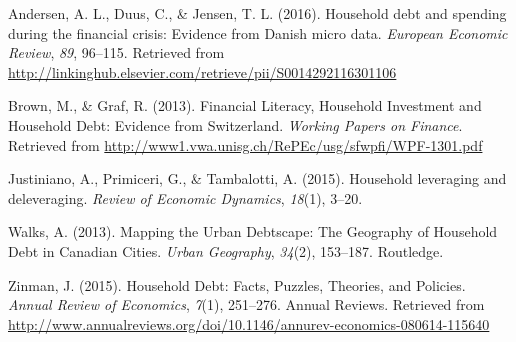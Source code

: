 \documentclass[10pt,twoside]{article}
\begin{document}
\hypertarget{refs}{}
\leavevmode\hypertarget{ref-Andersen2016}{}%
Andersen, A. L., Duus, C., \& Jensen, T. L. (2016). Household debt and
spending during the financial crisis: Evidence from Danish micro data.
\emph{European Economic Review}, \emph{89}, 96--115. Retrieved from
\url{http://linkinghub.elsevier.com/retrieve/pii/S0014292116301106}

\leavevmode\hypertarget{ref-Brown2013}{}%
Brown, M., \& Graf, R. (2013). Financial Literacy, Household Investment
and Household Debt: Evidence from Switzerland. \emph{Working Papers on
Finance}. Retrieved from
\url{http://www1.vwa.unisg.ch/RePEc/usg/sfwpfi/WPF-1301.pdf}

\leavevmode\hypertarget{ref-Justiniano2015b}{}%
Justiniano, A., Primiceri, G., \& Tambalotti, A. (2015). Household
leveraging and deleveraging. \emph{Review of Economic Dynamics},
\emph{18}(1), 3--20.

\leavevmode\hypertarget{ref-Walks2013}{}%
Walks, A. (2013). Mapping the Urban Debtscape: The Geography of
Household Debt in Canadian Cities. \emph{Urban Geography}, \emph{34}(2),
153--187. Routledge.

\leavevmode\hypertarget{ref-Zinman2015}{}%
Zinman, J. (2015). Household Debt: Facts, Puzzles, Theories, and
Policies. \emph{Annual Review of Economics}, \emph{7}(1), 251--276.
Annual Reviews. Retrieved from
\url{http://www.annualreviews.org/doi/10.1146/annurev-economics-080614-115640}
\end{document}
